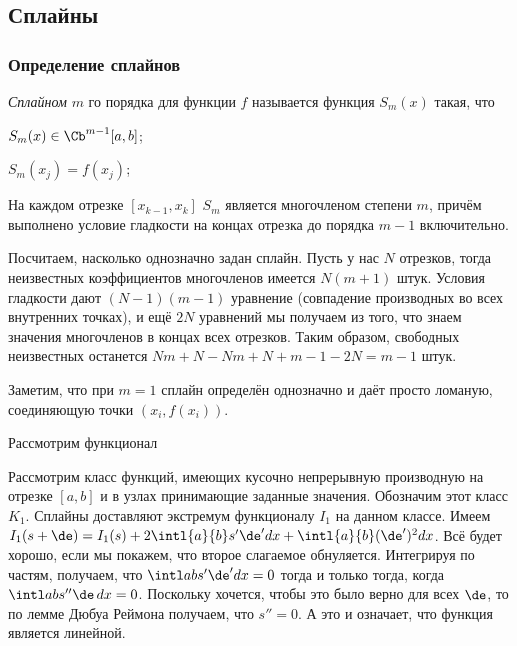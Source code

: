 \documentclass[a4paper]{article}
\begin{document}
\subsection{Сплайны}

\subsubsection{Определение сплайнов}

\begin{df}
\emph{Сплайном} $m$ го порядка для функции $f$ называется функция
$S_m(x)$ такая, что
\begin{points}{-3}
\item $S_m(x) \in \Cb^{m-1}[a,b]$;
\item $S_m(x_j) = f(x_j)$;
\item На каждом отрезке $[x_{k-1},x_k]$ $S_m$ является многочленом
  степени $m$, причём выполнено условие гладкости на концах отрезка до
  порядка $m-1$ включительно.
\end{points}
\end{df}

Посчитаем, насколько однозначно задан сплайн. Пусть у нас $N$
отрезков, тогда неизвестных коэффициентов многочленов имеется $N(m+1)$
штук. Условия гладкости дают $(N-1)(m-1)$ уравнение (совпадение
производных во всех внутренних точках), и ещё $2N$ уравнений мы
получаем из того, что знаем значения многочленов в концах всех
отрезков.  Таким образом, свободных неизвестных останется $Nm + N - Nm
+ N + m - 1 - 2N = m-1$ штук.

Заметим, что при $m=1$ сплайн определён однозначно и даёт просто
ломаную, соединяющую точки $(x_i, f(x_i))$.

Рассмотрим функционал 

Рассмотрим класс функций, имеющих кусочно непрерывную производную на
отрезке $[a,b]$ и в узлах принимающие заданные значения. Обозначим
этот класс $K_1$.  Сплайны доставляют экстремум функционалу $I_1$ на
данном классе.  Имеем $I_1(s + \de) = I_1(s) + 2\intl{a}{b} s'\de' dx
+ \intl{a}{b} (\de')^2dx$.  Всё будет хорошо, если мы покажем, что
второе слагаемое обнуляется. Интегрируя по частям, получаем, что
$\intl ab s'\de'dx = 0 $ тогда и только тогда, когда $\intl ab s''
\de\dx = 0$.  Поскольку хочется, чтобы это было верно для всех $\de$,
то по лемме Дюбуа Реймона получаем, что $s'' = 0$.  А это и означает,
что функция является линейной.
\end{document}
